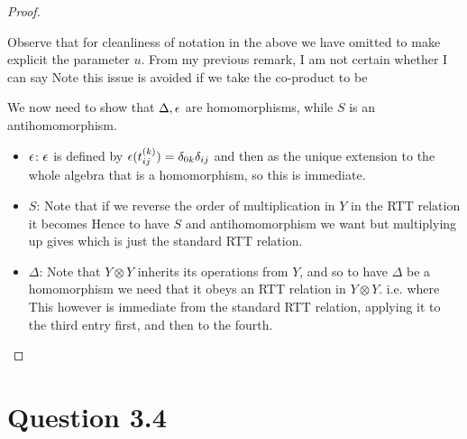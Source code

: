 \documentclass{article}
\begin{document}
\begin{proof}
\begin{remark}
Observe that for cleanliness of notation in the above we have omitted to make explicit the parameter $u$. From my previous remark, I am not certain whether I can say 
Note this issue is avoided if we take the co-product to be 
\end{remark}
We now need to show that $\Delta,\epsilon$ are homomorphisms, while $S$ is an antihomomorphism.
\begin{itemize}
    \item $\epsilon$: $\epsilon$ is defined by $ \epsilon(t_{ij}^{(k)}) = \delta_{0k}\delta_{ij}$ and then as the unique extension to the whole algebra that is a homomorphism, so this is immediate.
    \item $S$: Note that if we reverse the order of multiplication in $Y$ in the RTT relation it becomes 
    Hence to have $S$ and antihomomorphism we want 
    but multiplying up gives 
    which is just the standard RTT relation. 
    \item $\Delta$: Note that $Y \otimes Y$ inherits its operations from $Y$, and so to have $\Delta$ be a homomorphism we need that it obeys an RTT relation in $Y \otimes Y$. i.e. 
    where 
    This however is immediate from the standard RTT relation, applying it to the third entry first, and then to the fourth. 
\end{itemize}
\end{proof}

\section{Question 3.4}
\end{document}
